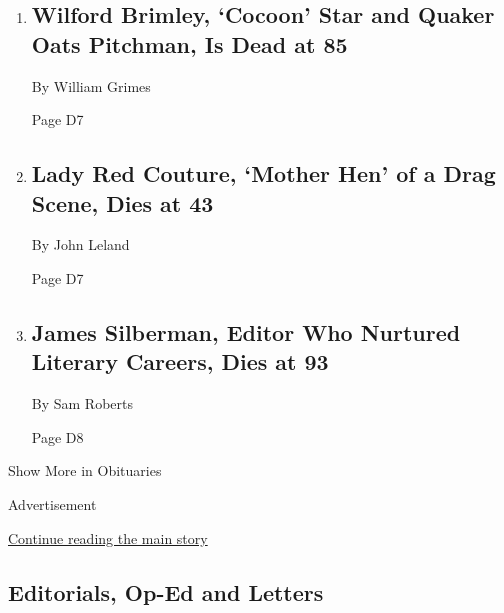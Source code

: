 \begin{enumerate}
\def\labelenumi{\arabic{enumi}.}
\item
  \href{/2020/08/01/obituaries/wilford-brimley-dead.html}{}

  \hypertarget{wilford-brimley-cocoon-star-and-quaker-oats-pitchman-is-dead-at-85-1}{%
  \subsection{Wilford Brimley, `Cocoon' Star and Quaker Oats Pitchman,
  Is Dead at
  85}\label{wilford-brimley-cocoon-star-and-quaker-oats-pitchman-is-dead-at-85-1}}

  By William Grimes

  Page D7
\item
  \href{/2020/08/01/arts/lady-red-couture-dead.html}{}

  \hypertarget{lady-red-couture-mother-hen-of-a-drag-scene-dies-at-43}{%
  \subsection{Lady Red Couture, `Mother Hen' of a Drag Scene, Dies at
  43}\label{lady-red-couture-mother-hen-of-a-drag-scene-dies-at-43}}

  By John Leland

  Page D7
\item
  \href{/2020/08/01/books/james-silberman-dead.html}{}

  \hypertarget{james-silberman-editor-who-nurtured-literary-careers-dies-at-93}{%
  \subsection{James Silberman, Editor Who Nurtured Literary Careers,
  Dies at
  93}\label{james-silberman-editor-who-nurtured-literary-careers-dies-at-93}}

  By Sam Roberts

  Page D8
\end{enumerate}

Show More in Obituaries

Advertisement

\protect\hyperlink{after-mid3}{Continue reading the main story}

\hypertarget{editorials-op-ed-and-letters}{%
\subsection{Editorials, Op-Ed and
Letters}\label{editorials-op-ed-and-letters}}

